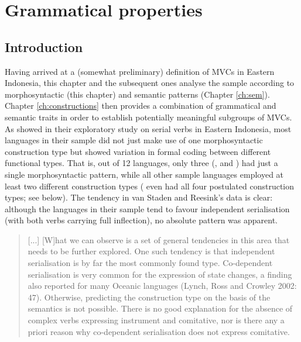 \chapter{Grammatical properties}\label{ch:gram}
\section{Introduction}

Having arrived at a (somewhat preliminary) definition of MVCs in Eastern Indonesia, this chapter and the subsequent ones analyse the sample according to morphosyntactic (this chapter) and semantic patterns (Chapter \ref{ch:sem}). Chapter \ref{ch:constructions} then provides a combination of grammatical and semantic traits in order to establish potentially meaningful subgroups of MVCs. As \citet{vanstaden2008serial} showed in their exploratory study on serial verbs in Eastern Indonesia, most languages in their sample did not just make use of one morphosyntactic construction type but showed variation in formal coding between different functional types. That is, out of 12 languages, only three (,  and ) had just a single morphosyntactic pattern, while all other sample languages employed at least two different construction types ( even had all four postulated construction types; see  below). The tendency in van Staden and Reesink's data is clear: although the languages in their sample tend to favour independent serialisation (with both verbs carrying full inflection), no absolute pattern was apparent.

\begin{quote}
[...] [W]hat we can observe is a set of general tendencies in this area that needs to be further explored. One such tendency is that independent serialisation is by far the most commonly found type. Co-dependent serialisation is very common for the expression of state changes, a finding also reported for many Oceanic languages (Lynch, Ross and Crowley 2002: 47). Otherwise, predicting the construction type on the basis of the semantics is not possible. There is no good explanation for the absence of complex verbs expressing instrument and comitative, nor is there any a priori reason why co-dependent serialisation does not express comitative. \citep[48]{vanstaden2008serial}\end{quote}\nocite{LynchEtAl2002}

